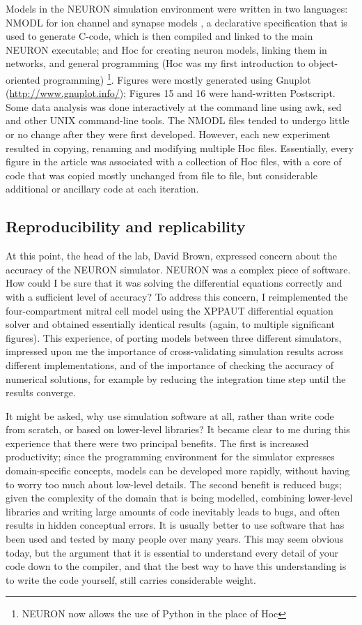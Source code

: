 Models in the NEURON simulation environment were written in two languages: NMODL for ion channel and synapse models \cite{Hines:2000},
a declarative specification that is used to generate C-code, which is then compiled and linked to the main NEURON executable;
and Hoc \cite{Hines:2006} for creating neuron models, linking them in networks, and general programming (Hoc was my first introduction
to object-oriented programming) \footnote{NEURON now allows the use of Python in the place of Hoc}.
Figures were mostly generated using Gnuplot (\url{http://www.gnuplot.info/}); Figures 15 and 16 were hand-written Postscript.
Some data analysis was done interactively at the command line using awk, sed and other UNIX command-line tools.
The NMODL files tended to undergo little or no change after they were first developed.
However, each new experiment resulted in copying, renaming and modifying multiple Hoc files.
Essentially, every figure in the article was associated with a collection of Hoc files, with a core of code that was copied
mostly unchanged from file to file, but considerable additional or ancillary code at each iteration.


\subsection{Reproducibility and replicability}

At this point, the head of the lab, David Brown, expressed concern about the accuracy of the NEURON simulator.
NEURON was a complex piece of software. How could I be sure that it was solving the differential equations correctly
and with a sufficient level of accuracy? To address this concern, I reimplemented the four-compartment mitral cell model
using the XPPAUT differential equation solver \cite{Ermentrout:2002} and obtained essentially identical results (again, to multiple significant figures).
This experience, of porting models between three different simulators, impressed upon me the importance of cross-validating
simulation results across different implementations, and of the importance of checking the accuracy of numerical solutions,
for example by reducing the integration time step until the results converge.

It might be asked, why use simulation software at all, rather than write code from scratch, or based on lower-level libraries?
It became clear to me during this experience that there were two principal benefits. The first is increased productivity;
since the programming environment for the simulator expresses domain-specific concepts, models can be developed more rapidly,
without having to worry too much about low-level details.
The second benefit is reduced bugs; given the complexity of the domain that is being modelled, combining lower-level libraries
and writing large amounts of code inevitably leads to bugs, and often results in hidden conceptual errors.
It is usually better to use software that has been used and tested by many people over many years.
This may seem obvious today, but the argument that it is essential to understand every detail of your code down to the compiler,
and that the best way to have this understanding is to write the code yourself, still carries considerable weight.

